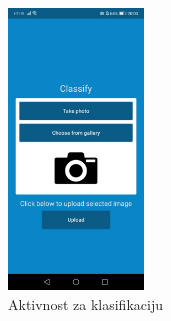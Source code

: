 \documentclass[times, utf8, zavrsni]{fer}
\begin{document}
%
\newpage
%
\begin{figure}[!h]
\centering
\includegraphics[width=0.32\textwidth]{./slike/app7}
\caption{Aktivnost za klasifikaciju}
\label{fig:app7}

\end{figure}
\end{document}
